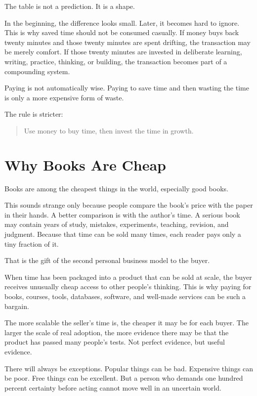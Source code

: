 The table is not a prediction. It is a shape.

In the beginning, the difference looks small. Later, it becomes hard to ignore. This is why saved time should not be consumed casually. If money buys back twenty minutes and those twenty minutes are spent drifting, the transaction may be merely comfort. If those twenty minutes are invested in deliberate learning, writing, practice, thinking, or building, the transaction becomes part of a compounding system.

Paying is not automatically wise. Paying to save time and then wasting the time is only a more expensive form of waste.

The rule is stricter:

\begin{quote}
Use money to buy time, then invest the time in growth.
\end{quote}

\section*{Why Books Are Cheap}

Books are among the cheapest things in the world, especially good books.

This sounds strange only because people compare the book's price with the paper in their hands. A better comparison is with the author's time. A serious book may contain years of study, mistakes, experiments, teaching, revision, and judgment. Because that time can be sold many times, each reader pays only a tiny fraction of it.

That is the gift of the second personal business model to the buyer.

When time has been packaged into a product that can be sold at scale, the buyer receives unusually cheap access to other people's thinking. This is why paying for books, courses, tools, databases, software, and well-made services can be such a bargain.

The more scalable the seller's time is, the cheaper it may be for each buyer. The larger the scale of real adoption, the more evidence there may be that the product has passed many people's tests. Not perfect evidence, but useful evidence.

There will always be exceptions. Popular things can be bad. Expensive things can be poor. Free things can be excellent. But a person who demands one hundred percent certainty before acting cannot move well in an uncertain world.

